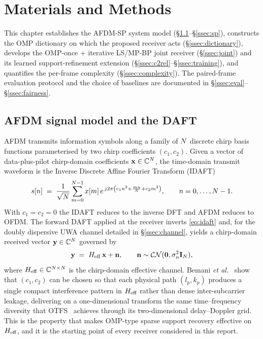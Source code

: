 \section{Materials and Methods}
\label{sec:method}

This chapter establishes the AFDM-SP system model (\S\ref{ssec:daft}--\S\ref{ssec:sp}), constructs the OMP dictionary on which the proposed receiver acts (\S\ref{ssec:dictionary}), develops the OMP-once + iterative LS/MP-BP joint receiver (\S\ref{ssec:joint}) and its learned support-refinement extension (\S\ref{ssec:c2rel}--\S\ref{ssec:training}), and quantifies the per-frame complexity (\S\ref{ssec:complexity}). The paired-frame evaluation protocol and the choice of baselines are documented in \S\ref{ssec:eval}--\S\ref{ssec:fairness}.

\subsection{AFDM signal model and the DAFT}
\label{ssec:daft}

AFDM transmits information symbols along a family of $N$ discrete chirp basis functions parameterised by two chirp coefficients $(c_1, c_2)$. Given a vector of data-plus-pilot chirp-domain coefficients $\mathbf{x} \in \mathbb{C}^{N}$, the time-domain transmit waveform is the Inverse Discrete Affine Fourier Transform (IDAFT)
\begin{equation}
s[n] \;=\; \frac{1}{\sqrt{N}} \sum_{m=0}^{N-1} x[m]\, e^{\, j 2\pi \left(c_1 n^2 + \frac{m n}{N} + c_2 m^2\right)}, \qquad n = 0, \dots, N-1. \label{eq:idaft}
\end{equation}
With $c_1 = c_2 = 0$ the IDAFT reduces to the inverse DFT and AFDM reduces to OFDM. The forward DAFT applied at the receiver inverts \eqref{eq:idaft} and, for the doubly dispersive UWA channel detailed in \S\ref{ssec:channel}, yields a chirp-domain received vector $\mathbf{y} \in \mathbb{C}^{N}$ governed by
\begin{equation}
\mathbf{y} \;=\; H_{\mathrm{eff}}\, \mathbf{x} + \mathbf{n}, \qquad \mathbf{n} \sim \mathcal{CN}(\mathbf{0}, \sigma_n^2 \mathbf{I}_{N}), \label{eq:afdm_model}
\end{equation}
where $H_{\mathrm{eff}} \in \mathbb{C}^{N \times N}$ is the chirp-domain effective channel. Bemani \emph{et al.}~\cite{bemani2023afdm} show that $(c_1, c_2)$ can be chosen so that each physical path $(l_p, k_p)$ produces a single compact interference pattern in $H_{\mathrm{eff}}$ rather than dense inter-subcarrier leakage, delivering on a one-dimensional transform the same time--frequency diversity that OTFS~\cite{hadani2017otfs,wei2021otfspromising} achieves through its two-dimensional delay--Doppler grid. This is the property that makes OMP-type sparse support recovery effective on $H_{\mathrm{eff}}$, and it is the starting point of every receiver considered in this report.

